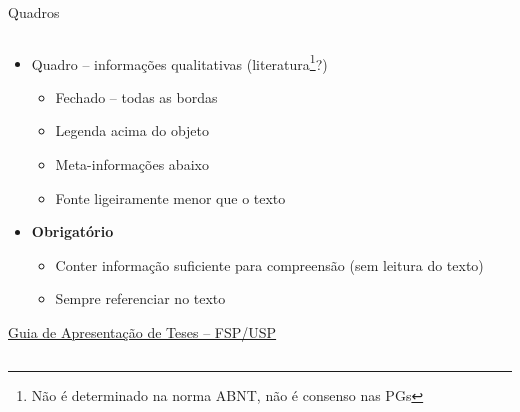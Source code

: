 \documentclass{beamer}
\begin{document}

\begin{frame}{\scriptsize Quadros}
  \begin{columns}%
    \begin{column}{.5\textwidth}
      \begin{itemize}
        \scriptsize
      \item Quadro -- informações qualitativas ({\tiny literatura\footnote[frame]{\scriptsize Não é determinado na norma ABNT, não é consenso nas PGs}?})
        \begin{itemize}
          \tiny
        \item Fechado -- todas as bordas
        \item Legenda acima do objeto
        \item Meta-informações abaixo
        \item Fonte ligeiramente menor que o texto
        \end{itemize}
        \bigskip
      \item \alert{\bf Obrigatório}
        \begin{itemize}
          \tiny
        \item Conter informação suficiente para compreensão ({\tiny sem leitura do texto})
        \item Sempre referenciar no texto
        \end{itemize}
      \end{itemize}
      \bigskip
      \bigskip
      \tiny
      \hfill \href{http://www.biblioteca.fsp.usp.br/~biblioteca/guia/i_cap_04.htm}
      {Guia de Apresentação de Teses -- FSP/USP}


\end{column}
\end{columns}
\end{frame}
\end{document}
